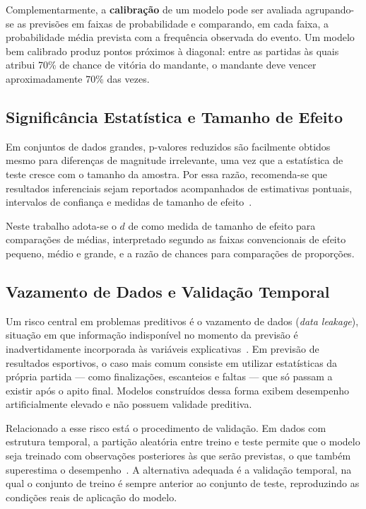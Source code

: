 Complementarmente, a \textbf{calibração} de um modelo pode ser avaliada
agrupando-se as previsões em faixas de probabilidade e comparando, em cada faixa,
a probabilidade média prevista com a frequência observada do evento. Um modelo
bem calibrado produz pontos próximos à diagonal: entre as partidas às quais
atribui 70\% de chance de vitória do mandante, o mandante deve vencer
aproximadamente 70\% das vezes.

\subsection{Significância Estatística e Tamanho de Efeito}\label{sec:efeito}

Em conjuntos de dados grandes, p-valores reduzidos são facilmente obtidos mesmo
para diferenças de magnitude irrelevante, uma vez que a estatística de teste
cresce com o tamanho da amostra. Por essa razão, recomenda-se que resultados
inferenciais sejam reportados acompanhados de estimativas pontuais, intervalos de
confiança e medidas de tamanho de efeito~\cite{Wasserstein2016}.

Neste trabalho adota-se o $d$ de  como medida de tamanho de
efeito para comparações de médias, interpretado segundo as faixas convencionais
de efeito pequeno, médio e grande, e a razão de chances para comparações de
proporções.

\subsection{Vazamento de Dados e Validação Temporal}\label{sec:vazamento}

Um risco central em problemas preditivos é o vazamento de dados (\textit{data
leakage}), situação em que informação indisponível no momento da previsão é
inadvertidamente incorporada às variáveis explicativas~\cite{Kaufman2012}. Em
previsão de resultados esportivos, o caso mais comum consiste em utilizar
estatísticas da própria partida — como finalizações, escanteios e faltas — que
só passam a existir após o apito final. Modelos construídos dessa forma exibem
desempenho artificialmente elevado e não possuem validade preditiva.

Relacionado a esse risco está o procedimento de validação. Em dados com estrutura
temporal, a partição aleatória entre treino e teste permite que o modelo seja
treinado com observações posteriores às que serão previstas, o que também
superestima o desempenho~\cite{Bergmeir2012}. A alternativa adequada é a
validação temporal, na qual o conjunto de treino é sempre anterior ao conjunto de
teste, reproduzindo as condições reais de aplicação do modelo.
